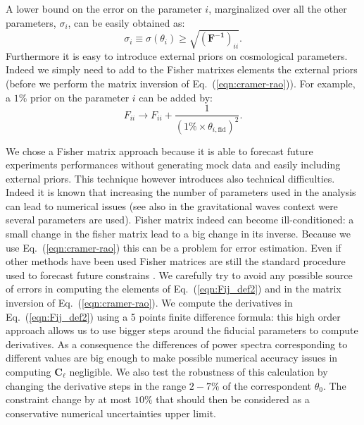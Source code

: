 \documentclass[aps,prd,reprint,superscriptaddress]{revtex4-1}
\newcommand\refeq[1]{Eq.~(\ref{eqn:#1})}
\begin{document}
A lower bound on the error on the parameter $i$, marginalized over all the other parameters, $\sigma_i$, can be easily obtained as:
\begin{equation}
\sigma_i \equiv \sigma (\theta_i) \geq \sqrt{(\mathbf{ F^{-1}})_{ii}}.
\label{eqn:cramer-rao}
\end{equation}
Furthermore it is easy to introduce external priors on cosmological parameters.
Indeed we simply need to add to the Fisher matrixes elements the external priors (before we perform the matrix inversion of \refeq{cramer-rao}).
For example, a $1\%$ prior on the parameter $i$ can be added by:
\begin{equation}
F_{ii} \rightarrow F_{ii} + \frac{1}{(1\% \times  \theta_{i,\text{fid}})^2}.
\end{equation}


We chose a Fisher matrix approach because it is able to forecast future experiments performances without generating mock data and easily including external priors. 
This technique however introduces also technical difficulties. 
Indeed it is known \cite{2006astro.ph..9591A} that increasing the number of parameters used in the analysis can lead to numerical issues (see also \cite{2008PhRvD..77d2001V} in the gravitational waves context were several parameters are used).
Fisher matrix indeed can become ill-conditioned: a small change in the fisher matrix lead to a big change in its inverse. Because we use \refeq{cramer-rao} this can be a problem for error estimation. 
Even if other methods have been used \cite{2006JCAP...10..013P,2006astro.ph..9591A} Fisher matrices are still the standard procedure used to forecast future constrains \cite{wu:2014}.
We carefully try to avoid any possible source of errors in computing the elements of \refeq{Fij_def2} and in the matrix inversion of \refeq{cramer-rao}.
We compute the derivatives in \refeq{Fij_def2} using a 5 points finite difference formula:
this high order approach allows us to use bigger steps around the fiducial parameters to compute derivatives. As a consequence the differences of power spectra corresponding to different values are big enough to make possible numerical accuracy issues in computing $\boldsymbol{C}_\ell$ negligible.
We also test the robustness of this calculation by changing the derivative steps in the range $2-7\%$ of the correspondent $\theta_{0}$. The constraint change by at most $10\%$ that should then be considered as a conservative numerical uncertainties upper limit.
\end{document}
